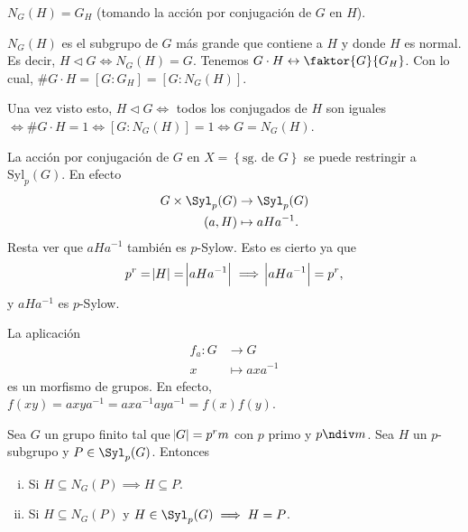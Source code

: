 \begin{obs}
    $N_G(H) = G_H$ (tomando la acción por conjugación de $G$ en $H$).
\end{obs}
\begin{obs}
    $N_G(H)$ es el subgrupo de $G$ más grande que contiene a $H$ y donde $H$ es normal. Es decir,
    $H \triangleleft G \iff N_G(H) = G$.
    Tenemos  $G \cdot H \leftrightarrow \faktor{G}{G_H}$. Con lo cual, $\# G \cdot H = \left[ G : G_H \right]
    = \left[ G : N_G(H) \right]$.

    Una vez visto esto, $H \triangleleft G \iff$ todos los conjugados de $H$ son iguales $\iff \# G \cdot H = 1
    \iff \left[ G : N_G(H) \right] = 1 \iff G = N _G(H)$.
\end{obs}

\begin{obs}
    La acción por conjugación de $G$ en $X = \left\{ \text{sg. de } G \right\}$ se puede restringir a
    $\text{Syl}_p(G)$. En efecto
    \[
        \begin{aligned}
            G \times \Syl_p(G) &\to \Syl_p(G) \\
            (a, H) &\mapsto aHa^{-1}.
        \end{aligned}
    \]
    Resta ver que $aHa^{-1}$ tambi\'{e}n es $p$-Sylow. Esto es cierto ya que
    \[
        p^r = \abs{H} = \abs{aHa^{-1}} \implies \abs{aHa^{-1}} = p^r,
    \]
    y $aHa^{-1}$ es $p$-Sylow.
\end{obs}

\begin{obs}
    La aplicación
    \[
        \begin{aligned}
            f_a \colon G &\to G \\
            x &\mapsto axa^{-1}
        \end{aligned}
    \]
    es un morfismo de grupos. En efecto, $f(xy) = axya^{-1} = axa^{-1}aya^{-1} = f(x)f(y)$.
\end{obs}

\begin{lema}\label{lema:stsyla}
    Sea $G$ un grupo finito tal que $\abs{G} = p^rm$ con $p$ primo y $p \ndiv m$. Sea $H$ un $p$-subgrupo y
    $P \in \Syl_p(G)$. Entonces
    \begin{enumerate}[i)]
        \item \label{item:lemasysl-1} Si $H \subseteq N_G(P) \implies H \subseteq P$.
        \item Si $H \subseteq N_G(P)$ y $H \in \Syl_p(G) \implies H = P$.
    \end{enumerate}
\end{lema}

